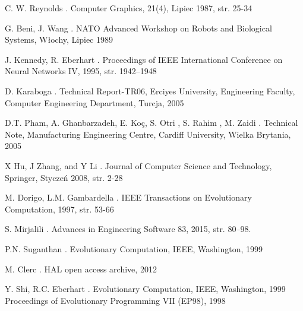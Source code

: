

\begin{thebibliography}{1}

C. W. Reynolds
.
\newblock Computer Graphics, 21(4), Lipiec 1987, str. 25-34

G. Beni, J. Wang
.
\newblock NATO Advanced Workshop on Robots and Biological Systems, Włochy, Lipiec 1989

J. Kennedy, R. Eberhart
.
\newblock Proceedings of IEEE International Conference on Neural Networks IV, 1995, str. 1942–1948


D. Karaboga
.
\newblock  Technical Report-TR06, Erciyes University, Engineering Faculty, Computer Engineering Department, Turcja, 2005


D.T. Pham, A. Ghanbarzadeh, E. Koç, S. Otri , S. Rahim , M. Zaidi 
.
\newblock Technical Note, Manufacturing Engineering Centre, Cardiff University, Wielka Brytania, 2005


 X Hu, J Zhang, and Y Li
.
\newblock Journal of Computer Science and Technology, Springer, Styczeń 2008, str. 2-28


M. Dorigo, L.M. Gambardella
.
\newblock IEEE Transactions on Evolutionary Computation, 1997, str. 53-66


S. Mirjalili
.
\newblock Advances in Engineering Software 83, 2015, str. 80–98.


P.N. Suganthan
.
\newblock Evolutionary Computation, IEEE, Washington, 1999


M. Clerc
.
\newblock HAL open access archive, 2012


Y. Shi, R.C. Eberhart
.
\newblock Evolutionary Computation, IEEE, Washington, 1999
Proceedings of Evolutionary Programming VII (EP98), 1998



\end{thebibliography}

